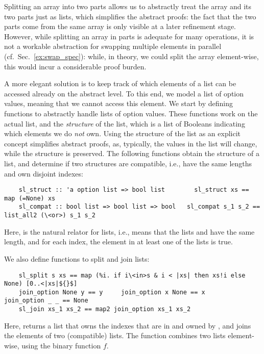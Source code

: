 \documentclass[sn-mathphys,Numbered]{sn-jnl}
\theoremstyle{thmstyleone}%
\theoremstyle{definition}%
\theoremstyle{thmstylethree}%
\begin{document}
  Splitting an array into two parts allows us to abstractly treat the array and its two parts just as lists,
  which simplifies the abstract proofs: the fact that the two parts come from the same array is only visible
  at a later refinement stage. However, while splitting an array in parts is adequate for many operations,
  it is not a workable abstraction for swapping multiple elements in parallel (cf.~Sec.~\ref{ex:swap_spec}):
  while, in theory, we could split the array element-wise, this would incur a considerable proof burden.

  A more elegant solution is to keep track of which elements of a list can be accessed already on the abstract level. To this end,
  we model a list of option values,  meaning that we cannot access this element.
  We start by defining functions to abstractly handle lists of option values.
  These functions work on the actual list, and the \emph{structure} of the list,
  which is a list of Booleans indicating which elements we do \emph{not} own.
  Using the structure of the list as an explicit concept simplifies abstract proofs, as, typically,
  the values in the list will change, while the structure is preserved.
  The following functions obtain the structure of a list, and determine if two
  structures are compatible, i.e., have the same lengths and own disjoint indexes:
  \begin{lstlisting}
    sl_struct :: 'a option list => bool list        sl_struct xs == map (=None) xs
    sl_compat :: bool list => bool list => bool   sl_compat s_1 s_2 == list_all2 (\<or>) s_1 s_2
  \end{lstlisting}
  Here,  is the natural relator for lists, i.e.,  means that the lists
   and  have the same length, and for each index, the element in at least one of the lists is true.

  We also define functions to split and join lists:
  \begin{lstlisting}
    sl_split s xs == map (%i. if i\<in>s & i < |xs| then xs!i else None) [0..<|xs|${}$]
    join_option None y == y     join_option x None == x      join_option _ _ == None
    sl_join xs_1 xs_2 == map2 join_option xs_1 xs_2
  \end{lstlisting}
  Here,  returns a list that owns the indexes that are in  and owned by ,
  and  joins the elements of two (compatible) lists. The function  combines two lists element-wise, using the binary function \is$f$.
\end{document}
